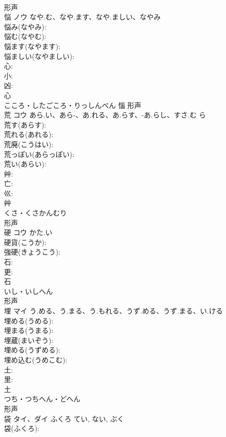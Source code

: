 \documentclass[8pt]{extreport}
\begin{document}
\begin{CJK}{UTF8}{min}
\\	形声 
\\	悩	ノウ	なや.む、なや.ます、なや.ましい、なやみ		
\\	悩み(なやみ): 
\\	悩む(なやむ): 
\\	悩ます(なやます): 
\\	悩ましい(なやましい): 
\\	心: 
\\	小: 
\\	凶: 
\\	心	
\\	こころ・したごころ・りっしんべん	惱	形声 
\\	荒	コウ	あら.い、あら-、あ.れる、あ.らす、-あ.らし、すさ.む	ら	
\\	荒す(あらす): 
\\	荒れる(あれる): 
\\	荒廃(こうはい): 
\\	荒っぽい(あらっぽい): 
\\	荒い(あらい): 
\\	艸: 
\\	亡: 
\\	巛: 
\\	艸	
\\	くさ・くさかんむり	
\\	形声 
\\	硬	コウ	かた.い		
\\	硬貨(こうか): 
\\	強硬(きょうこう): 
\\	石: 
\\	更: 
\\	石	
\\	いし・いしへん	
\\	形声 
\\	埋	マイ	う.める、う.まる、う.もれる、うず.める、うず.まる、い.ける		
\\	埋める(うめる): 
\\	埋まる(うまる): 
\\	埋蔵(まいぞう): 
\\	埋める(うずめる): 
\\	埋め込む(うめこむ): 
\\	土: 
\\	里: 
\\	土	
\\	つち・つちへん・どへん	
\\	形声 
\\	袋	タイ、ダイ	ふくろ	てい, ない, ぶく	
\\	袋(ふくろ): 

\end{CJK}
\end{document}
